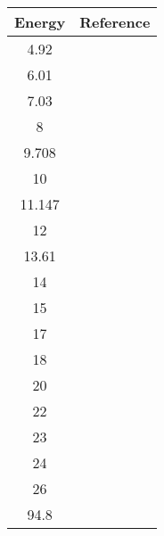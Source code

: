 \begin{tabular}{c c} 
    \toprule
    \bf{Energy} & \bf{Reference} \\
    \midrule
    4.92 & \cite{Kinney1972}\\
    6.01 & \cite{Kinney1972}\\
    7.03 & \cite{Kinney1972}\\
    8 & \cite{Bucher1974}\\
    9.708 & \cite{Glendinning1982}\\
    10 & \cite{Anli1989}\\
    11.147 & \cite{Glendinning1982}\\
    12 & \cite{Anli1989}\\
    13.61 & \cite{Boerker1988}\\
    14 & \cite{Anli1989}\\
    15 & \cite{Dave1983}\\
    17 & \cite{Anli1989}\\
    18 & \cite{Delaroche1986}\\
    20 & \cite{Delaroche1986}\\
    22 & \cite{Delaroche1986}\\
    23 & \cite{Lam1985}\\
    24 & \cite{Delaroche1986}\\
    26 & \cite{Delaroche1986}\\
    94.8 & \cite{Mermod2006}\\
    \bottomrule
\end{tabular}
